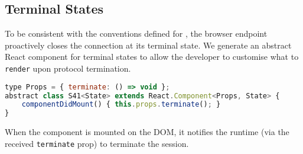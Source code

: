 \subsection{Terminal States}
To be consistent with the conventions defined for ,
the browser endpoint proactively closes the connection at its terminal state.
We generate an abstract React component for terminal states 
to allow the developer to customise what to
\texttt{render} upon protocol termination.

\begin{lstlisting}[language=javascript]
type Props = { terminate: () => void };
abstract class S41<State> extends React.Component<Props, State> {
	componentDidMount() { this.props.terminate(); }	
}
\end{lstlisting}

When the component is mounted on the DOM, it notifies the runtime
(via the received \texttt{terminate} prop) to terminate the session.